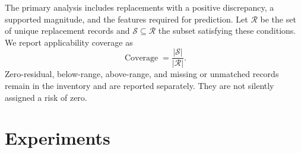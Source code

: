 \documentclass{article}
\begin{document}
The primary analysis includes replacements with a positive discrepancy, a supported magnitude, and the features required for prediction.
Let $\mathcal{R}$ be the set of unique replacement records and $\mathcal{S}\subseteq\mathcal{R}$ the subset satisfying these conditions.
We report applicability coverage as
\begin{equation}
\operatorname{Coverage}=\frac{|\mathcal{S}|}{|\mathcal{R}|}.
\label{eq:applicability-coverage}
\end{equation}
Zero-residual, below-range, above-range, and missing or unmatched records remain in the inventory and are reported separately.
They are not silently assigned a risk of zero.

\section{Experiments}
\label{sec:experiments}


{
\small


}
\end{document}
